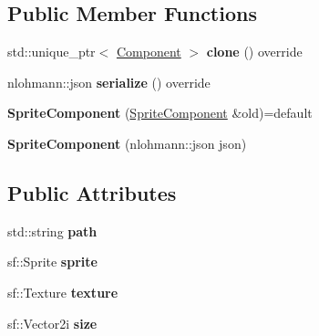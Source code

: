 \subsection*{Public Member Functions}
\begin{DoxyCompactItemize}
\item 
\hypertarget{classSpriteComponent_a9f3d289105de1bfd5679b1f0095f2a37}{std\-::unique\-\_\-ptr$<$ \hyperlink{classComponent}{Component} $>$ {\bfseries clone} () override}\label{classSpriteComponent_a9f3d289105de1bfd5679b1f0095f2a37}

\item 
\hypertarget{classSpriteComponent_a7ad0beabec8efc13e1a22a0c261bb266}{nlohmann\-::json {\bfseries serialize} () override}\label{classSpriteComponent_a7ad0beabec8efc13e1a22a0c261bb266}

\item 
\hypertarget{classSpriteComponent_ad0ee9b504468905b0232f53c87a0d5dc}{{\bfseries Sprite\-Component} (\hyperlink{classSpriteComponent}{Sprite\-Component} \&old)=default}\label{classSpriteComponent_ad0ee9b504468905b0232f53c87a0d5dc}

\item 
\hypertarget{classSpriteComponent_a108d41a569c938928920886ac205785d}{{\bfseries Sprite\-Component} (nlohmann\-::json json)}\label{classSpriteComponent_a108d41a569c938928920886ac205785d}

\end{DoxyCompactItemize}
\subsection*{Public Attributes}
\begin{DoxyCompactItemize}
\item 
\hypertarget{classSpriteComponent_a3c9b51c639bae669d8d8a9e0ab6c1463}{std\-::string {\bfseries path}}\label{classSpriteComponent_a3c9b51c639bae669d8d8a9e0ab6c1463}

\item 
\hypertarget{classSpriteComponent_ac49ac20d7050d549b853b97c43790164}{sf\-::\-Sprite {\bfseries sprite}}\label{classSpriteComponent_ac49ac20d7050d549b853b97c43790164}

\item 
\hypertarget{classSpriteComponent_a60a5b6b5e855d1cc9ed87d4ea1762f99}{sf\-::\-Texture {\bfseries texture}}\label{classSpriteComponent_a60a5b6b5e855d1cc9ed87d4ea1762f99}

\item 
\hypertarget{classSpriteComponent_a12da3a2d88705372ca6adfe18f26fbda}{sf\-::\-Vector2i {\bfseries size}}\label{classSpriteComponent_a12da3a2d88705372ca6adfe18f26fbda}

\end{DoxyCompactItemize}
